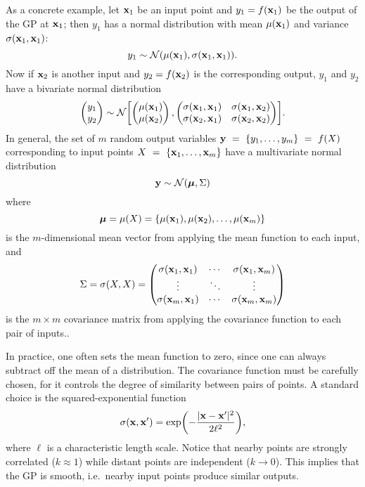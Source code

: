\documentclass[aps,prc,reprint,amsmath]{revtex4-1}
\begin{document}
As a concrete example, let $\mathbf x_1$ be an input point and $y_1 = f(\mathbf x_1)$ be the output of the GP at $\mathbf x_1$; then $y_1$ has a normal distribution with mean $\mu(\mathbf x_1)$ and variance $\sigma(\mathbf x_1, \mathbf x_1)$:
\begin{equation}
  y_1 \sim \mathcal N(\mu(\mathbf x_1), \sigma(\mathbf x_1, \mathbf x_1)).
\end{equation}
Now if $\mathbf x_2$ is another input and $y_2 = f(\mathbf x_2)$ is the corresponding output, $y_1$ and $y_2$ have a bivariate normal distribution
\begin{equation}
  \begin{pmatrix}
    y_1 \\ y_2
  \end{pmatrix}
  \sim \mathcal N\biggl[
    \begin{pmatrix}
      \mu(\mathbf x_1) \\ \mu(\mathbf x_2)
    \end{pmatrix},
    \begin{pmatrix}
      \sigma(\mathbf x_1, \mathbf x_1) & \sigma(\mathbf x_1, \mathbf x_2) \\
      \sigma(\mathbf x_2, \mathbf x_1) & \sigma(\mathbf x_2, \mathbf x_2) \\
    \end{pmatrix}
  \biggr].
\end{equation}
In general, the set of $m$ random output variables $\mathbf y~=~\{y_1, \ldots, y_m\}~=~f(X)$ corresponding to input points $X~=~\{\mathbf x_1, \ldots, \mathbf x_m\}$ have a multivariate normal distribution
\begin{equation}
  \mathbf y \sim \mathcal N(\boldsymbol\mu, \Sigma)
\end{equation}
where
\begin{equation}
  \boldsymbol\mu = \mu(X) = \{\mu(\mathbf x_1), \mu(\mathbf x_2), \ldots, \mu(\mathbf x_m)\} \\
\end{equation}
is the $m$-dimensional mean vector from applying the mean function to each input, and
\begin{equation}
  \Sigma = \sigma(X, X) =
  \begin{pmatrix}
    \sigma(\mathbf x_1, \mathbf x_1) & \cdots & \sigma(\mathbf x_1, \mathbf x_m) \\
    \vdots & \ddots & \vdots \\
    \sigma(\mathbf x_m, \mathbf x_1) & \cdots & \sigma(\mathbf x_m, \mathbf x_m) \\
  \end{pmatrix}
\end{equation}
is the $m \times m$ covariance matrix from applying the covariance function to each pair of inputs..

In practice, one often sets the mean function to zero, since one can always subtract off the mean of a distribution.
The covariance function must be carefully chosen, for it controls the degree of similarity between pairs of points.
A standard choice is the squared-exponential function
\begin{equation}
  \sigma(\mathbf x, \mathbf x') = \exp\biggl( -\frac{|\mathbf x - \mathbf x'|^2}{2\ell^2} \biggr),
\end{equation}
where $\ell$ is a characteristic length scale.
Notice that nearby points are strongly correlated ($k \approx 1$) while distant points are independent ($k \rightarrow 0$).
This implies that the GP is smooth, i.e.\ nearby input points produce similar outputs.
\end{document}

